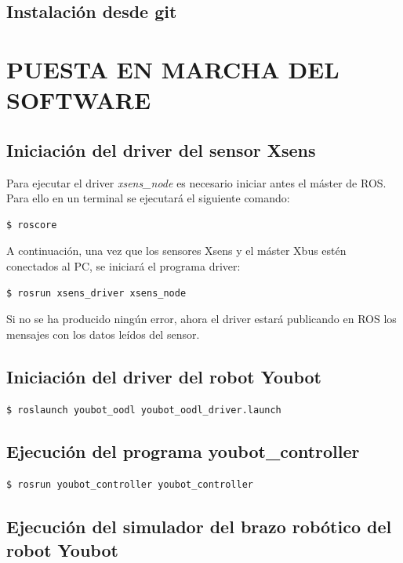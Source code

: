 \documentclass[12pt, a4paper]{report}
\begin{document}
\subsection{Instalación desde git}

\section{PUESTA EN MARCHA DEL SOFTWARE}

\subsection{Iniciación del driver del sensor Xsens}

Para ejecutar el driver \textit{xsens\_node} es necesario iniciar antes el máster de ROS. Para ello en un terminal se ejecutará el siguiente comando:

\begin{verbatim}
$ roscore
\end{verbatim}

A continuación, una vez que los sensores Xsens y el máster Xbus estén conectados al PC, se iniciará el programa driver:

\begin{verbatim}
$ rosrun xsens_driver xsens_node
\end{verbatim}

Si no se ha producido ningún error, ahora el driver estará publicando en ROS los mensajes con los datos leídos del sensor.

\subsection{Iniciación del driver del robot Youbot}

\begin{verbatim}
$ roslaunch youbot_oodl youbot_oodl_driver.launch
\end{verbatim}

\subsection{Ejecución del programa youbot\_controller}

\begin{verbatim}
$ rosrun youbot_controller youbot_controller
\end{verbatim}

\subsection{Ejecución del simulador del brazo robótico del robot Youbot}
\end{document}

